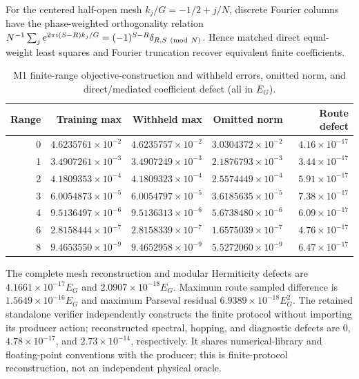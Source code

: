 \documentclass[11pt]{article}
\begin{document}
For the centered half-open mesh $k_j/G=-1/2+j/N$, discrete Fourier columns have the phase-weighted orthogonality relation $N^{-1}\sum_j e^{2\pi i(S-R)k_j/G}=(-1)^{S-R}\delta_{R,S\ ({\rm mod}\ N)}$. Hence matched direct equal-weight least squares and Fourier truncation recover equivalent finite coefficients.
\begin{table}[h]\centering\small\caption{M1 finite-range objective-construction and withheld errors, omitted norm, and direct/mediated coefficient defect (all in $E_G$).}\begin{tabular}{rrrrr}\toprule Range & Training max & Withheld max & Omitted norm & Route defect\\\midrule
0&$4.6235761\times10^{-2}$&$4.6235757\times10^{-2}$&$3.0304372\times10^{-2}$&$4.16\times10^{-17}$\\1&$3.4907261\times10^{-3}$&$3.4907249\times10^{-3}$&$2.1876793\times10^{-3}$&$3.44\times10^{-17}$\\2&$4.1809353\times10^{-4}$&$4.1809323\times10^{-4}$&$2.5574449\times10^{-4}$&$5.91\times10^{-17}$\\3&$6.0054873\times10^{-5}$&$6.0054797\times10^{-5}$&$3.6185635\times10^{-5}$&$7.38\times10^{-17}$\\4&$9.5136497\times10^{-6}$&$9.5136313\times10^{-6}$&$5.6738480\times10^{-6}$&$6.09\times10^{-17}$\\6&$2.8158444\times10^{-7}$&$2.8158339\times10^{-7}$&$1.6575039\times10^{-7}$&$4.76\times10^{-17}$\\8&$9.4653550\times10^{-9}$&$9.4652958\times10^{-9}$&$5.5272060\times10^{-9}$&$6.47\times10^{-17}$\\\bottomrule\end{tabular}\end{table}

The complete mesh reconstruction and modular Hermiticity defects are $4.1661\times10^{-17}E_G$ and $2.0907\times10^{-18}E_G$. Maximum route sampled difference is $1.5649\times10^{-16}E_G$ and maximum Parseval residual $6.9389\times10^{-18}E_G^2$. The retained standalone verifier independently constructs the finite protocol without importing its producer action; reconstructed spectral, hopping, and diagnostic defects are $0$, $4.78\times10^{-17}$, and $2.73\times10^{-14}$, respectively. It shares numerical-library and floating-point conventions with the producer; this is finite-protocol reconstruction, not an independent physical oracle.
\end{document}
